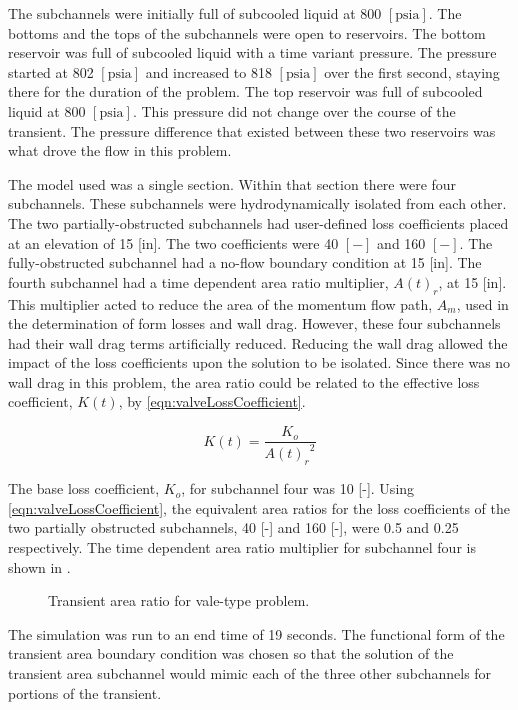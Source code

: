 The subchannels were initially full of subcooled liquid at 800 $[ \text{psia}] $.
The bottoms and the tops of the subchannels were open to reservoirs.
The bottom reservoir was full of subcooled liquid with a time variant pressure.
The pressure started at 802 $[ \text{psia} ] $ and increased to 818 $[ \text{psia}]$ over the first second, staying there for the duration of the problem.
The top reservoir was full of subcooled liquid at 800 $[\text{psia} ] $.
This pressure did not change over the course of the transient.
The pressure difference that existed between these two reservoirs was what drove the flow in this problem.

The model used was a single section.
Within that section there were four subchannels.
These subchannels were hydrodynamically isolated from each other.
The two partially-obstructed subchannels had user-defined loss coefficients placed at an elevation of 15 [in].
The two coefficients were 40 $[-]$ and 160 $[-]$.
The fully-obstructed subchannel had a no-flow boundary condition at 15 [in].
The fourth subchannel had a time dependent area ratio multiplier, $A(t)_r$, at 15 [in].
This multiplier acted to reduce the area of the momentum flow path, $A_m$, used in the determination of form losses and wall drag.
However, these four subchannels had their wall drag terms artificially reduced.
Reducing the wall drag allowed the impact of the loss coefficients upon the solution to be isolated.
Since there was no wall drag in this problem, the area ratio could be related to the effective loss coefficient, $K(t)$, by \eqref{eqn:valveLossCoefficient}.

\begin{equation}
\label{eqn:valveLossCoefficient}
K(t) = \frac{K_{o}}{{A(t)_r}^2}
\end{equation}

The base loss coefficient, $K_o$, for subchannel four was 10 [-].
Using \eqref{eqn:valveLossCoefficient}, the equivalent area ratios for the loss coefficients of the two partially obstructed subchannels, 40 [-] and 160 [-], were 0.5 and 0.25 respectively.
The time dependent area ratio multiplier for subchannel four is shown in .

\begin{figure}[h!tb]
\centering

\caption{Transient area ratio for vale-type problem.}
\label{fig:valveTransientArea}
\end{figure}

The simulation was run to an end time of 19 seconds.
The functional form of the transient area boundary condition was chosen so that the solution of the transient area subchannel would mimic each of the three other subchannels for portions of the transient.

